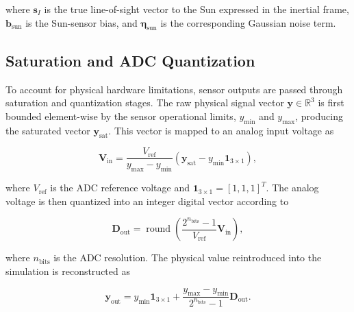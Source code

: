 where \(\mathbf{s}_{I}\) is the true line-of-sight vector to the Sun expressed in the inertial frame, \(\mathbf{b}_{\mathrm{sun}}\) is the Sun-sensor bias, and \(\boldsymbol{\eta}_{\mathrm{sun}}\) is the corresponding Gaussian noise term.

\subsection{Saturation and ADC Quantization}
\label{app:adcs_sensor_adc_quantization}

To account for physical hardware limitations, sensor outputs are passed through saturation and quantization stages. The raw physical signal vector \(\mathbf{y}\in\mathbb{R}^{3}\) is first bounded element-wise by the sensor operational limits, \(y_{\min}\) and \(y_{\max}\), producing the saturated vector \(\mathbf{y}_{\mathrm{sat}}\). This vector is mapped to an analog input voltage as

\begin{equation}
    \mathbf{V}_{\mathrm{in}}
    =
    \frac{
        V_{\mathrm{ref}}
    }{
        y_{\max} - y_{\min}
    }
    \left(
        \mathbf{y}_{\mathrm{sat}}
        -
        y_{\min}
        \mathbf{1}_{3\times1}
    \right),
    \label{eq:app_adcs_sensor_saturation_voltage}
\end{equation}

where \(V_{\mathrm{ref}}\) is the ADC reference voltage and \(\mathbf{1}_{3\times1}=[1,1,1]^T\). The analog voltage is then quantized into an integer digital vector according to

\begin{equation}
    \mathbf{D}_{\mathrm{out}}
    =
    \operatorname{round}
    \left(
        \frac{
            2^{n_{\mathrm{bits}}}-1
        }{
            V_{\mathrm{ref}}
        }
        \mathbf{V}_{\mathrm{in}}
    \right),
    \label{eq:app_adcs_adc_digital_output}
\end{equation}

where \(n_{\mathrm{bits}}\) is the ADC resolution. The physical value reintroduced into the simulation is reconstructed as

\begin{equation}
    \mathbf{y}_{\mathrm{out}}
    =
    y_{\min}
    \mathbf{1}_{3\times1}
    +
    \frac{
        y_{\max} - y_{\min}
    }{
        2^{n_{\mathrm{bits}}}-1
    }
    \mathbf{D}_{\mathrm{out}}.
    \label{eq:app_adcs_adc_reconstructed_output}
\end{equation}

